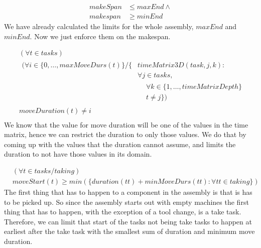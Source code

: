  \begin{equation}\label{eq:66}
 \begin{aligned}
 makeSpan &\le maxEnd \land\\
 makespan &\ge minEnd
 \end{aligned}
 \end{equation}
 We have already calculated the limits for the whole assembly, $maxEnd$ and $minEnd$. Now we just enforce them on the makespan.
 
 \begin{equation}
 \begin{aligned}\label{eq:67}
 &(\forall t \in tasks)\\
 &\begin{aligned}
 (\forall i \in \{0 , \ldots , maxMoveDurs(t)\} / \{&timeMatrix3D(task,j,k) :\\
 &\forall j \in tasks,\\
 &\begin{aligned}
 &\forall k \in \{1 , \ldots , timeMatrixDepth\}\\
 &t \neq j\})
 \end{aligned}
 \end{aligned}\\
 &moveDuration(t) \neq i \\
 \end{aligned}
 \end{equation}
We know that the value for move duration will be one of the values in the time matrix, hence we can restrict the duration to only those values. We do that by coming up with the values that the duration cannot assume, and limits the duration to not have those values in its domain.
 
 \begin{equation}
 \begin{aligned}\label{eq:69}
 &(\forall t \in tasks / taking) \\
 &moveStart(t) \ge min(\{duration(tt) + minMoveDurs(tt) : \forall tt \in taking\})
 \end{aligned}
 \end{equation}
 The first thing that has to happen to a component in the assembly is that is has to be picked up. So since the assembly starts out with empty machines the first thing that has to happen, with the exception of a tool change, is a take task. Therefore, we can limit that start of the tasks not being take tasks to happen at earliest after the take task with the smallest sum of duration and minimum move duration.
 
